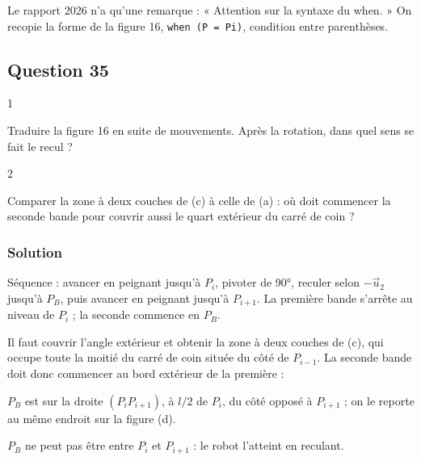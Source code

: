 \documentclass[11pt,a4paper]{article}
\newcommand{\equationajustee}[1]{%
  \sbox{\boiteequation}{$\displaystyle #1$}%
  \ifdim\wd\boiteequation>\linewidth
    \[\resizebox{\linewidth}{!}{\usebox{\boiteequation}}\]%
  \else
    \[#1\]%
  \fi}
\begin{document}
\begin{jury}

Le rapport 2026 n'a qu'une remarque : « Attention sur la syntaxe du when. » On recopie la forme de la figure 16, \texttt{when\ (P\ =\ Pi)}, condition entre parenthèses.

\end{jury}

\hypertarget{question-35}{%
\subsection{Question 35}\label{question-35}}

\begin{indication}{1}

Traduire la figure 16 en suite de mouvements. Après la rotation, dans quel sens se fait le recul ?

\end{indication}

\begin{indication}{2}

Comparer la zone à deux couches de (c) à celle de (a) : où doit commencer la seconde bande pour couvrir aussi le quart extérieur du carré de coin ?

\end{indication}

\hypertarget{solution-34}{%
\subsubsection{Solution}\label{solution-34}}

Séquence : avancer en peignant jusqu'à \(P_i\), pivoter de 90°, reculer selon \(-\vec u_2\) jusqu'à \(P_B\), puis avancer en peignant jusqu'à \(P_{i+1}\). La première bande s'arrête au niveau de \(P_i\) ; la seconde commence en \(P_B\).

Il faut couvrir l'angle extérieur et obtenir la zone à deux couches de (c), qui occupe toute la moitié du carré de coin située du côté de \(P_{i-1}\). La seconde bande doit donc commencer au bord extérieur de la première :

\equationajustee{\boxed{\overrightarrow{P_iP_B} = -\frac{l}{2}\,\vec u_2}}

\(P_B\) est sur la droite \((P_iP_{i+1})\), à \(l/2\) de \(P_i\), du côté opposé à \(P_{i+1}\) ; on le reporte au même endroit sur la figure (d).

\begin{piege}

\(P_B\) ne peut pas être entre \(P_i\) et \(P_{i+1}\) : le robot l'atteint en reculant.

\end{piege}
\end{document}
